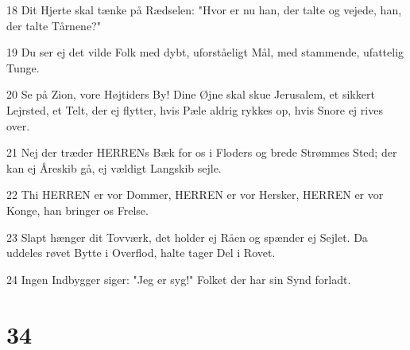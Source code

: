\par 18 Dit Hjerte skal tænke på Rædselen: "Hvor er nu han, der talte og vejede, han, der talte Tårnene?"
\par 19 Du ser ej det vilde Folk med dybt, uforståeligt Mål, med stammende, ufattelig Tunge.
\par 20 Se på Zion, vore Højtiders By! Dine Øjne skal skue Jerusalem, et sikkert Lejrsted, et Telt, der ej flytter, hvis Pæle aldrig rykkes op, hvis Snore ej rives over.
\par 21 Nej der træder HERRENs Bæk for os i Floders og brede Strømmes Sted; der kan ej Åreskib gå, ej vældigt Langskib sejle.
\par 22 Thi HERREN er vor Dommer, HERREN er vor Hersker, HERREN er vor Konge, han bringer os Frelse.
\par 23 Slapt hænger dit Tovværk, det holder ej Råen og spænder ej Sejlet. Da uddeles røvet Bytte i Overflod, halte tager Del i Rovet.
\par 24 Ingen Indbygger siger: "Jeg er syg!" Folket der har sin Synd forladt.

\chapter{34}

